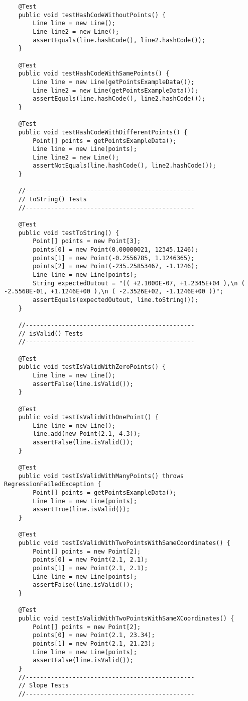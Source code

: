 \begin{lstlisting}
	@Test
	public void testHashCodeWithoutPoints() {
		Line line = new Line();
		Line line2 = new Line();
		assertEquals(line.hashCode(), line2.hashCode());
	}
	
	@Test
	public void testHashCodeWithSamePoints() {
		Line line = new Line(getPointsExampleData());
		Line line2 = new Line(getPointsExampleData());
		assertEquals(line.hashCode(), line2.hashCode());
	}
	
	@Test
	public void testHashCodeWithDifferentPoints() {
		Point[] points = getPointsExampleData();
		Line line = new Line(points);
		Line line2 = new Line();
		assertNotEquals(line.hashCode(), line2.hashCode());
	}
	
	//-----------------------------------------------
	// toString() Tests
	//-----------------------------------------------
	
	@Test
	public void testToString() {
		Point[] points = new Point[3];
		points[0] = new Point(0.00000021, 12345.1246);
		points[1] = new Point(-0.2556785, 1.1246365);
		points[2] = new Point(-235.25853467, -1.1246);
		Line line = new Line(points);
		String expectedOutout = "(( +2.1000E-07, +1.2345E+04 ),\n ( -2.5568E-01, +1.1246E+00 ),\n ( -2.3526E+02, -1.1246E+00 ))";
		assertEquals(expectedOutout, line.toString());
	}
	
	//-----------------------------------------------
	// isValid() Tests
	//-----------------------------------------------
	
	@Test
	public void testIsValidWithZeroPoints() {
		Line line = new Line();
		assertFalse(line.isValid());
	}
	
	@Test
	public void testIsValidWithOnePoint() {
		Line line = new Line();
		line.add(new Point(2.1, 4.3));
		assertFalse(line.isValid());
	}
	
	@Test
	public void testIsValidWithManyPoints() throws RegressionFailedException {
		Point[] points = getPointsExampleData();
		Line line = new Line(points);
		assertTrue(line.isValid());
	}
	
	@Test
	public void testIsValidWithTwoPointsWithSameCoordinates() {
		Point[] points = new Point[2];
		points[0] = new Point(2.1, 2.1);
		points[1] = new Point(2.1, 2.1);
		Line line = new Line(points);
		assertFalse(line.isValid());
	}
	
	@Test
	public void testIsValidWithTwoPointsWithSameXCoordinates() {
		Point[] points = new Point[2];
		points[0] = new Point(2.1, 23.34);
		points[1] = new Point(2.1, 21.23);
		Line line = new Line(points);
		assertFalse(line.isValid());
	}
	//-----------------------------------------------
	// Slope Tests
	//-----------------------------------------------
	

\end{lstlisting}
